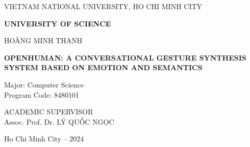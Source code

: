 \begin{titlepage}
	
	\begin{mdframed}[linewidth=1pt, 
		linecolor=black, 
		innerleftmargin=10mm, 
		innerrightmargin=10mm, 
		innertopmargin=10mm, 
		innerbottommargin=10mm]
		
		\centering
		\vspace*{1cm}
		
		{VIETNAM NATIONAL UNIVERSITY, HO CHI MINH CITY\par}
		\vspace{0.25cm}
		\textbf{UNIVERSITY OF SCIENCE}\\
		
		\vspace{2cm}
		
		\large HOÀNG MINH THANH \\
		
		\vspace{2cm}
		
		\Large \textbf{\MakeUppercase{OpenHuman: A Conversational Gesture Synthesis System Based on Emotion and Semantics}}\\
		
		\vspace{1cm}
		
		\flushleft
		{\normalsize Major: Computer Science}\\
		{\normalsize Program Code: 8480101}\\
		
		\vspace{2cm}
		
		\centering
		{\normalsize ACADEMIC SUPERVISOR}\\ 
		{\normalsize Assoc. Prof. Dr. LÝ QUỐC NGỌC}\\
		
		\vfill
		\vspace{3cm}
		
		{\small Ho Chi Minh City – 2024}
	\end{mdframed}
\end{titlepage}

\pagebreak
{}

\pagebreak
